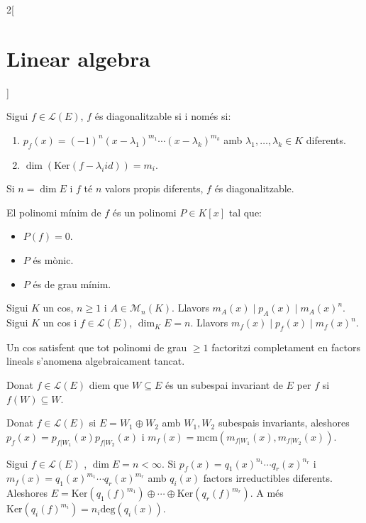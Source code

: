 \documentclass[../../../main.tex]{subfiles}
\begin{document}
\begin{multicols}{2}[\section{Linear algebra}]
\begin{theorem}
Sigui $f\in\mathcal{L}(E)$, $f$ és diagonalitzable si i només si:
\begin{enumerate}
    \item $p_f(x)=(-1)^n(x-\lambda_1)^{m_1}\cdots(x-\lambda_k)^{m_k}$ amb $\lambda_1,\ldots,\lambda_k\in K$ diferents.
    \item $\dim(\text{Ker}(f-\lambda_i id))=m_i$.
\end{enumerate}
\end{theorem}
\begin{corollary}
Si $n=\dim E$ i $f$ té $n$ valors propis diferents, $f$ és diagonalitzable.
\end{corollary}
\begin{definition}
El polinomi mínim de $f$ és un polinomi $P\in K[x]$ tal que:
\begin{itemize}
    \item $P(f)=0$.
    \item $P$ és mònic.
    \item $P$ és de grau mínim.
\end{itemize}
\end{definition}
\begin{theorem}
Sigui $K$ un cos, $n\geq 1$ i $A\in\mathcal{M}_n(K)$. Llavors $m_A(x)\mid p_A(x)\mid m_A(x)^n$. Sigui $K$ un cos i $f\in\mathcal{L}(E)$, $\dim_K E=n$. Llavors $m_f(x)\mid p_f(x)\mid m_f(x)^n$. 
\end{theorem}
\begin{definition}
Un cos satisfent que tot polinomi de grau $\geq 1$ factoritzi completament en factors lineals s'anomena algebraicament tancat.
\end{definition}
\begin{definition}
Donat $f\in\mathcal{L}(E)$ diem que $W\subseteq E$ és un subespai invariant de $E$ per $f$ si $f(W)\subseteq W$.
\end{definition}
\begin{lemma}
Donat $f\in\mathcal{L}(E)$ si $E=W_1\oplus W_2$ amb $W_1,W_2$ subespais invariants, aleshores $p_f(x)=p_{f|W_1}(x)p_{f|W_2}(x)$ i $m_f(x)=\text{mcm}(m_{f|W_1}(x),m_{f|W_2}(x))$.
\end{lemma}
\begin{theorem}
Sigui $f\in\mathcal{L}(E)$ , $\dim E=n<\infty$. Si $p_f(x)=q_1(x)^{n_1}\cdots q_r(x)^{n_r}$ i $m_f(x)=q_1(x)^{m_1}\cdots q_r(x)^{m_r}$ amb $q_i(x)$ factors irreductibles diferents. Aleshores $E=\text{Ker}(q_1(f)^{m_1})\oplus\cdots\oplus\text{Ker}(q_r(f)^{m_r})$. A més $\text{Ker}(q_i(f)^{m_i})=n_i\text{deg}(q_i(x))$.

\end{theorem}
\end{multicols}
\end{document}
